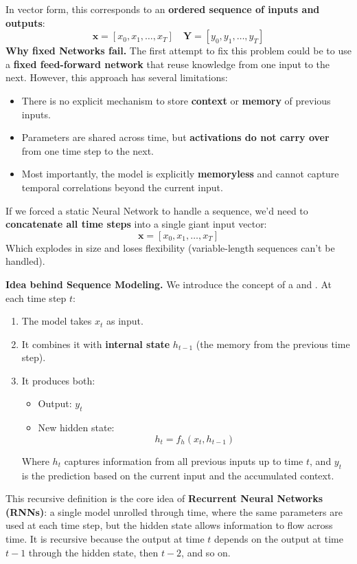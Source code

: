 In vector form, this corresponds to an \textbf{ordered sequence of inputs and outputs}:
\begin{equation*}
    \mathbf{x} = \left[x_0, x_1, \dots, x_T\right] \quad \mathbf{Y} = \left[y_0, y_1, \dots, y_T\right]
\end{equation*}
\textcolor{Green3}{ \textbf{Why fixed Networks fail.}} The first attempt to fix this problem could be to use a \textbf{fixed feed-forward network} that reuse knowledge from one input to the next. However, this approach has several limitations:
\begin{itemize}
    \item There is no explicit mechanism to store \textbf{context} or \textbf{memory} of previous inputs.
    \item Parameters are shared across time, but \textbf{activations do not carry over} from one time step to the next.
    \item Most importantly, the model is explicitly \textbf{memoryless} and cannot capture temporal correlations beyond the current input.
\end{itemize}
If we forced a static Neural Network to handle a sequence, we'd need to \textbf{concatenate all time steps} into a single giant input vector:
\begin{equation*}
    \mathbf{x} = \left[x_0, x_1, \dots, x_T\right]
\end{equation*}
Which explodes in size and loses flexibility (variable-length sequences can't be handled).

\highspace
\textcolor{Green3}{ \textbf{Idea behind Sequence Modeling.}} We introduce the concept of a  and . At each time step $t$:
\begin{enumerate}
    \item The model takes $x_t$ as input.
    \item It combines it with \textbf{internal state} $h_{t-1}$ (the memory from the previous time step).
    \item It produces both:
    \begin{itemize}
        \item Output: $y_t$
        \item New hidden state:
        \begin{equation}
            h_t = f_h\left(x_t, h_{t-1}\right)
        \end{equation}
    \end{itemize}
    Where $h_t$ captures information from all previous inputs up to time $t$, and $y_t$ is the prediction based on the current input and the accumulated context.
\end{enumerate}
This recursive definition is the core idea of \textbf{Recurrent Neural Networks (RNNs)}: a single model unrolled through time, where the same parameters are used at each time step, but the hidden state allows information to flow across time. It is recursive because the output at time $t$ depends on the output at time $t-1$ through the hidden state, then $t-2$, and so on.

